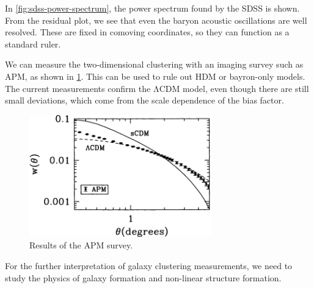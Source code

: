 In \cref{fig:sdss-power-spectrum}, the power spectrum found by the SDSS is shown.
From the residual plot, we see that even the baryon acoustic oscillations are well resolved.
These are fixed in comoving coordinates, so they can function as a standard ruler.

We can measure the two-dimensional clustering with an imaging survey such as APM, as shown in \cref{fig:apm}.
This can be used to rule out HDM or bayron-only models.
The current measurements confirm the ΛCDM model, even though there are still small deviations, which come from the scale dependence of the bias factor.
\begin{figure}
	\centering
	\includegraphics[width=0.7\textwidth]{img/ch-03/apm.pdf}
	\caption{Results of the APM survey.}
	\label{fig:apm}
\end{figure}

For the further interpretation of galaxy clustering measurements, we need to study the physics of galaxy formation and non-linear structure formation.

